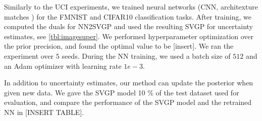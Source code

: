 \documentclass{article}
\begin{document}
Similarly to the UCI experiments, we trained neural networks (CNN, architexture matches \citet{immer2021improving}) for the FMNIST and CIFAR10 classification tasks. After training, we computed the duals for NN2SVGP and used the resulting SVGP for uncertainty estimates, see \cref{tbl:imagesuper}. We performed hyperparameter optimization over the prior precision, and found the optimal value to be [insert]. We ran the experiment over $5$ seeds. During the NN training, we used a batch size of $512$ and an Adam optimizer with learning rate $1e-3$.

In addition to uncertainty estimates, our method can update the posterior when given new data. We gave the SVGP model 10 \% of the test dataset used for evaluation, and compare the performance of the SVGP model and the retrained NN in [INSERT TABLE]. 
\end{document}
